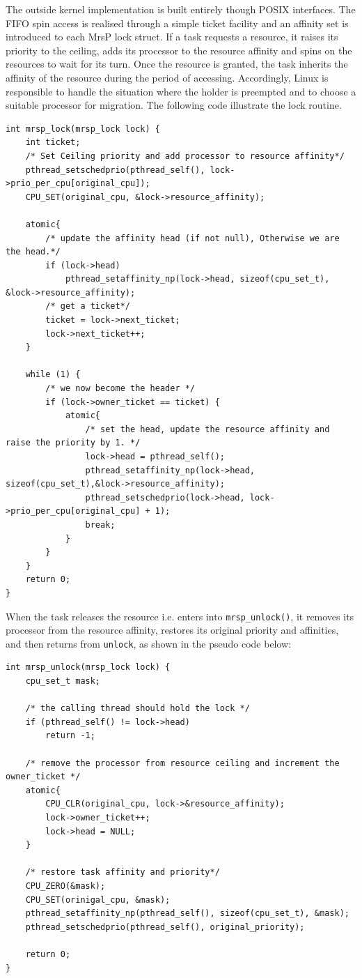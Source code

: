 \documentclass{report}
\begin{document}
The outside kernel implementation is built entirely though POSIX interfaces. The FIFO spin access is realised through a simple ticket facility and an affinity set is introduced to each MrsP lock struct. If a task requests a resource, it raises its priority to the ceiling, adds its processor to the resource affinity and spins on the resources to wait for its turn. Once the resource is granted, the task inherits the affinity of the resource during the period of accessing. Accordingly, Linux is responsible to handle the situation where the holder is preempted and to choose a suitable processor for migration. The following code illustrate the lock routine.
\begin{lstlisting}
int mrsp_lock(mrsp_lock lock) {
	int ticket;
	/* Set Ceiling priority and add processor to resource affinity*/
	pthread_setschedprio(pthread_self(), lock->prio_per_cpu[original_cpu]);
	CPU_SET(original_cpu, &lock->resource_affinity);
	
	atomic{
		/* update the affinity head (if not null), Otherwise we are the head.*/
		if (lock->head)
			pthread_setaffinity_np(lock->head, sizeof(cpu_set_t), &lock->resource_affinity);
		/* get a ticket*/
		ticket = lock->next_ticket;
		lock->next_ticket++;
	}
	
	while (1) {
		/* we now become the header */
		if (lock->owner_ticket == ticket) {
			atomic{
				/* set the head, update the resource affinity and raise the priority by 1. */
				lock->head = pthread_self();
				pthread_setaffinity_np(lock->head, sizeof(cpu_set_t),&lock->resource_affinity);
				pthread_setschedprio(lock->head, lock->prio_per_cpu[original_cpu] + 1);
				break;
			}
		}
	}
	return 0;
}
\end{lstlisting}

When the task releases the resource i.e. enters into \texttt{mrsp\_unlock()}, it removes its processor from the resource affinity, restores its original priority and affinities, and then returns from \texttt{unlock}, as shown in the pseudo code below:

\begin{lstlisting}
int mrsp_unlock(mrsp_lock lock) {
	cpu_set_t mask;

	/* the calling thread should hold the lock */
	if (pthread_self() != lock->head) 
		return -1;

	/* remove the processor from resource ceiling and increment the owner_ticket */
	atomic{
		CPU_CLR(original_cpu, lock->&resource_affinity);
		lock->owner_ticket++;
		lock->head = NULL;
	}

	/* restore task affinity and priority*/
	CPU_ZERO(&mask);
	CPU_SET(orinigal_cpu, &mask);
	pthread_setaffinity_np(pthread_self(), sizeof(cpu_set_t), &mask);
	pthread_setschedprio(pthread_self(), original_priority);

	return 0;
}
\end{lstlisting}
\end{document}
